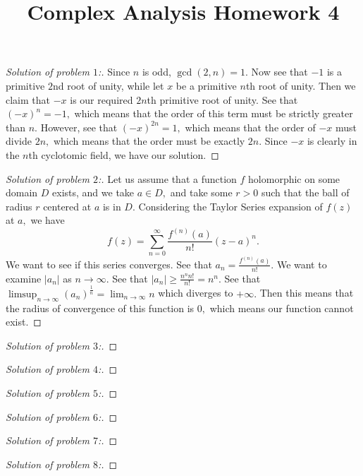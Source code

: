 \documentclass[letterpaper,11pt,twoside]{article}
\title{Complex Analysis Homework 4}
\theoremstyle{proposition}
\theoremstyle{definition}
\theoremstyle{theorem}
\theoremstyle{definition}
\theoremstyle{definition}
\theoremstyle{definition}
\theoremstyle{lemma}
\theoremstyle{definition}
\theoremstyle{definition}
\theoremstyle{corollary}
\theoremstyle{definition}
\theoremstyle{definition}
\theoremstyle{definition}
\newcommand{\abs}[1]{\left \vert #1 \right \vert}
\begin{document}
	\maketitle
	\begin{proof}[Solution of problem $1$:]
		Since $n$ is odd, $\gcd(2,n)=1.$ Now see that $-1$ is a primitive $2$nd root of unity, while let $x$ be a primitive $n$th root of unity. Then we 
		claim that $-x$ is our required $2n$th primitive root of unity. See that $(-x)^n=-1,$ which means that the order of this term must be strictly 
		greater than $n.$ However, see that $(-x)^{2n}=1,$ which means that the order of $-x$ must divide $2n,$ which means that the order must be exactly 
		$2n.$ Since $-x$ is clearly in the $n$th cyclotomic field, we have our solution.
	\end{proof}
	\begin{proof}[Solution of problem $2$:]
		Let us assume that a function $f$ holomorphic on some domain $D$ exists, and we take $a \in D,$ and take some $r>0$ such that the ball of radius $r$
		centered at $a$ is in $D.$ Considering the Taylor Series expansion of $f(z)$ at $a,$ we have $$f(z)= \sum_{n=0}^{\infty} 
		\frac{f^{(n)}(a)}{n!}(z-a)^n.$$ We want to see if this series converges. See that $a_n= \frac{f^{(n)}(a)}{n!}.$ We want to examine $\abs{a_n}$ as $n 
		\to \infty.$ See that $\abs{a_n} \geq \frac{n^nn!}{n!} = n^n.$ See that $\limsup_{n \to \infty} (a_n)^{\frac{1}{n}}= \lim_{n \to \infty} n$ which 
		diverges to $+\infty.$ Then this means that the radius of convergence of this function is $0,$ which means our function cannot exist.
			
 	\end{proof}
	\begin{proof}[Solution of problem $3$:]
	
	\end{proof}
	\begin{proof}[Solution of problem $4$:]
	
	\end{proof}
	\begin{proof}[Solution of problem $5$:]
	
	\end{proof}
	\begin{proof}[Solution of problem $6$:]
	
	\end{proof}
	\begin{proof}[Solution of problem $7$:]
	
	\end{proof}
	\begin{proof}[Solution of problem $8$:]
	
	\end{proof}
\end{document}
